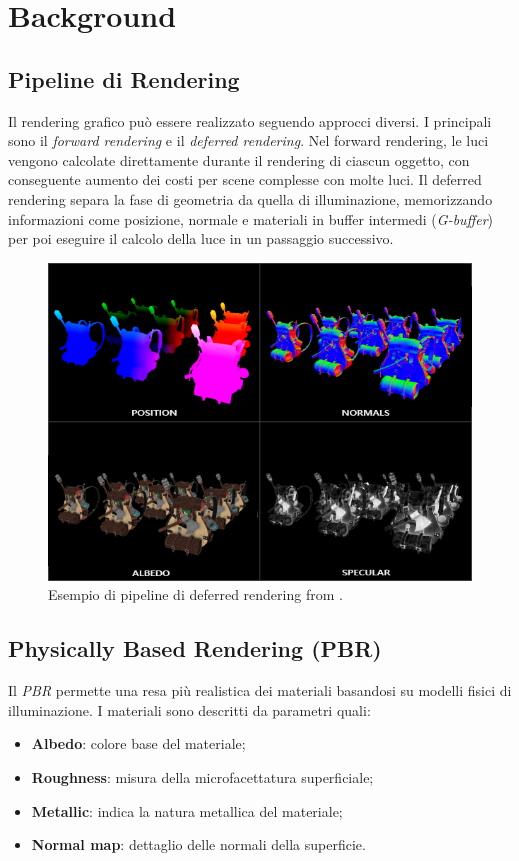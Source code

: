 \documentclass[12pt,a4paper,openright,twoside]{book}
\begin{document}
\chapter{Background}
\label{chap:background}

\section{Pipeline di Rendering}
Il rendering grafico può essere realizzato seguendo approcci diversi. I principali sono il \emph{forward rendering}
e il \emph{deferred rendering}.  
Nel forward rendering, le luci vengono calcolate direttamente durante il rendering di ciascun oggetto, con conseguente
aumento dei costi per scene complesse con molte luci.  
Il deferred rendering separa la fase di geometria da quella di illuminazione, memorizzando informazioni come posizione,
normale e materiali in buffer intermedi (\emph{G-buffer}) per poi eseguire il calcolo della luce in un passaggio successivo.  
\begin{figure}[h!]
    \centering
    \includegraphics[width=.8\linewidth]{figures/g_buffer_example.png}
    \caption{Esempio di pipeline di deferred rendering from \cite{learnopengl}.}
    \label{fig:deferred-pipeline}
\end{figure}

\section{Physically Based Rendering (\ac{PBR})}
Il \emph{\acl{PBR}} permette una resa più realistica dei materiali basandosi su modelli fisici di illuminazione.  
I materiali sono descritti da parametri quali:
\begin{itemize}
    \item \textbf{Albedo}: colore base del materiale;
    \item \textbf{Roughness}: misura della microfacettatura superficiale;
    \item \textbf{Metallic}: indica la natura metallica del materiale;
    \item \textbf{Normal map}: dettaglio delle normali della superficie.
\end{itemize}
\end{document}
